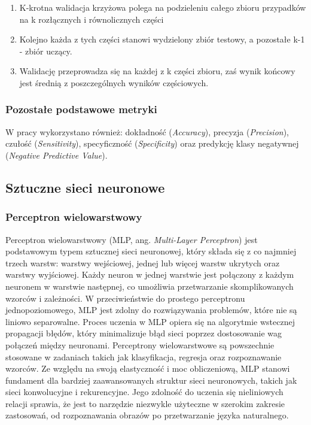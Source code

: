\begin{enumerate}
    \item K-krotna walidacja krzyżowa polega na podzieleniu całego zbioru przypadków na k
rozłącznych i równolicznych części
    \item Kolejno każda z tych części stanowi wydzielony zbiór testowy, a pozostałe k-1 - zbiór uczący.
    \item Walidację przeprowadza się na każdej z k części zbioru, zaś wynik końcowy jest średnią z poszczególnych wyników częściowych.
\end{enumerate}

\subsubsection{Pozostałe podstawowe metryki}
W pracy wykorzystano również: dokładność (\textit{Accuracy}), precyzja (\textit{Precision}), czułość (\textit{Sensitivity}), specyficzność (\textit{Specificity}) oraz predykcję klasy negatywnej (\textit{Negative Predictive Value}). 

\subsection{Sztuczne sieci neuronowe}
\subsubsection{Perceptron wielowarstwowy}
Perceptron wielowarstwowy (MLP, ang. \textit{Multi-Layer Perceptron}) jest podstawowym typem sztucznej sieci neuronowej, który składa się z co najmniej trzech warstw: warstwy wejściowej, jednej lub więcej warstw ukrytych oraz warstwy wyjściowej. Każdy neuron w jednej warstwie jest połączony z każdym neuronem w warstwie następnej, co umożliwia przetwarzanie skomplikowanych wzorców i zależności. W przeciwieństwie do prostego perceptronu jednopoziomowego, MLP jest zdolny do rozwiązywania problemów, które nie są liniowo separowalne. Proces uczenia w MLP opiera się na algorytmie wstecznej propagacji błędów, który minimalizuje błąd sieci poprzez dostosowanie wag połączeń między neuronami. Perceptrony wielowarstwowe są powszechnie stosowane w zadaniach takich jak klasyfikacja, regresja oraz rozpoznawanie wzorców. Ze względu na swoją elastyczność i moc obliczeniową, MLP stanowi fundament dla bardziej zaawansowanych struktur sieci neuronowych, takich jak sieci konwolucyjne i rekurencyjne. Jego zdolność do uczenia się nieliniowych relacji sprawia, że jest to narzędzie niezwykle użyteczne w szerokim zakresie zastosowań, od rozpoznawania obrazów po przetwarzanie języka naturalnego.

